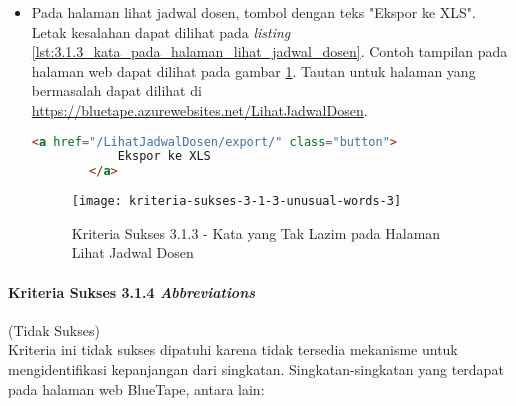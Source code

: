 \begin{itemize}
    \item Pada halaman lihat jadwal dosen, tombol dengan teks "Ekspor ke XLS". Letak kesalahan dapat dilihat pada \textit{listing} \ref{lst:3.1.3_kata_pada_halaman_lihat_jadwal_dosen}. Contoh tampilan pada halaman web dapat dilihat pada gambar \ref{fig:3.1.3_unusual_words_3}. Tautan untuk halaman yang bermasalah dapat dilihat di \url{https://bluetape.azurewebsites.net/LihatJadwalDosen}.
    \begin{lstlisting}[frame=single, label={lst:3.1.3_kata_pada_halaman_lihat_jadwal_dosen}, language=HTML, caption=Kriteria Sukses 3.1.3 - Kata yang Tak Lazim pada Halaman Lihat Jadwal Dosen]
        <a href="/LihatJadwalDosen/export/" class="button">
            Ekspor ke XLS
        </a>
    \end{lstlisting}
    
    \begin{figure}[H]
        \centering  
        \texttt{[image: kriteria-sukses-3-1-3-unusual-words-3]}  
        \caption[Kriteria Sukses 3.1.3 - Kata yang Tak Lazim pada Halaman Lihat Jadwal Dosen]{Kriteria Sukses 3.1.3 - Kata yang Tak Lazim pada Halaman Lihat Jadwal Dosen}
        \label{fig:3.1.3_unusual_words_3}  
    \end{figure}
    
\end{itemize}

\paragraph{Kriteria Sukses 3.1.4 \textit{Abbreviations}}
\label{par:kepatuhan_bluetape_kriteria_sukses_3.1.4}
(Tidak Sukses)\\

Kriteria ini tidak sukses dipatuhi karena tidak tersedia mekanisme untuk mengidentifikasi kepanjangan dari singkatan. Singkatan-singkatan yang terdapat pada halaman web BlueTape, antara lain:

